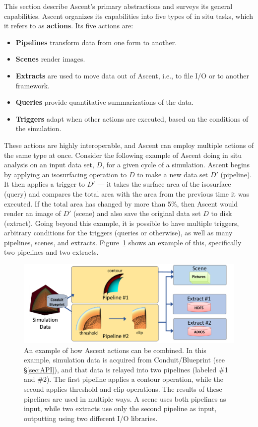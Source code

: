 This section describe Ascent's primary abstractions and surveys its general capabilities.
%
Ascent organizes its capabilities into five types of in situ tasks, which
it refers to as \textbf{actions}.
%
Its five actions are:
\begin{itemize}
\item \textbf{Pipelines} transform data from one form to another.
%
\item \textbf{Scenes} render images.
%
\item \textbf{Extracts} are used to move data out of Ascent, i.e., to file I/O or to another framework.
%
\item \textbf{Queries} provide quantitative summarizations of the data.
%
\item \textbf{Triggers} adapt when other actions are executed, based on the conditions of the simulation.
%
\end{itemize}

These actions are highly interoperable, and Ascent can employ multiple actions of the same type
at once.
%
Consider the following example of Ascent doing in situ analysis on an input data set, $D$,
for a given cycle of a simulation.
%
Ascent begins by applying an isosurfacing operation to $D$ to make a new data set $D'$ (pipeline).
%
It then applies a trigger to $D'$ --- it takes the surface area of the isosurface (query) and compares
the total area with the area from the previous time it was executed.
%
If the total area has changed by more than 5\%, then Ascent would render an image of $D'$ (scene)
and also save the original data set $D$ to disk (extract).
%
Going beyond this example, it is possible to have multiple triggers, arbitrary conditions for
the triggers (queries or otherwise), as well as many pipelines, scenes, and extracts.
%
Figure~\ref{fig:ascent_example} shows an example of this, specifically two pipelines and two extracts.

\begin{figure}
\centering
\includegraphics[width=\textwidth]{images/ascent_actions_diagram.pdf}
\caption{\label{fig:ascent_example} An example of how Ascent actions can be combined.
In this example, simulation data is acquired from Conduit/Blueprint (see \S\ref{sec:API}),
and that data is relayed into two pipelines (labeled \#1 and \#2).
The first pipeline applies a contour operation, while the second
applies threshold and clip operations.
%
The results of these pipelines are used in multiple ways.
A scene uses both pipelines as input, while two extracts use only the second pipeline
as input, outputting using two different I/O libraries.}
\end{figure}

